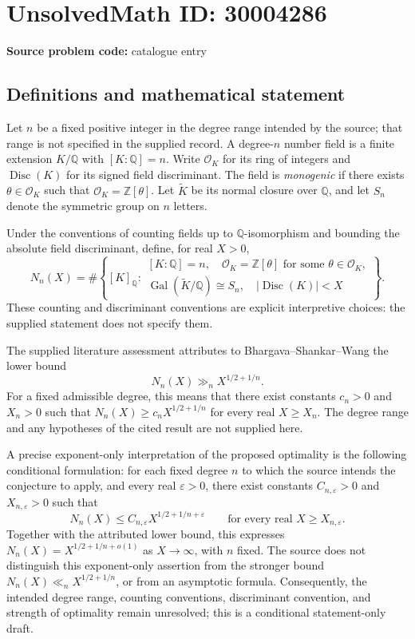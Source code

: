\documentclass[11pt]{article}
\newcommand{\Z}{\mathbb{Z}}
\newcommand{\Q}{\mathbb{Q}}
\begin{document}
\section*{UnsolvedMath ID: 30004286}
\textbf{Source problem code:} catalogue entry
\subsection{Definitions and mathematical statement}
Let \(n\) be a fixed positive integer in the degree range intended by the source; that range is not specified in the supplied record. A degree-\(n\) number field is a finite extension \(K/\Q\) with \([K:\Q]=n\). Write \(\mathcal O_K\) for its ring of integers and \(\operatorname{Disc}(K)\) for its signed field discriminant. The field is \emph{monogenic} if there exists \(\theta\in\mathcal O_K\) such that \(\mathcal O_K=\Z[\theta]\). Let \(\widetilde K\) be its normal closure over \(\Q\), and let \(S_n\) denote the symmetric group on \(n\) letters.

Under the conventions of counting fields up to \(\Q\)-isomorphism and bounding the absolute field discriminant, define, for real \(X>0\),
\[
N_n(X)=\#\left\{[K]_{\Q}:\begin{array}{l}
[K:\Q]=n,\quad \mathcal O_K=\Z[\theta]\text{ for some }\theta\in\mathcal O_K,\\
\operatorname{Gal}(\widetilde K/\Q)\cong S_n,\quad |\operatorname{Disc}(K)|<X
\end{array}\right\}.
\]
These counting and discriminant conventions are explicit interpretive choices: the supplied statement does not specify them.

The supplied literature assessment attributes to Bhargava--Shankar--Wang the lower bound
\[
N_n(X)\gg_n X^{1/2+1/n}.
\]
For a fixed admissible degree, this means that there exist constants \(c_n>0\) and \(X_n>0\) such that \(N_n(X)\ge c_nX^{1/2+1/n}\) for every real \(X\ge X_n\). The degree range and any hypotheses of the cited result are not supplied here.

A precise exponent-only interpretation of the proposed optimality is the following conditional formulation: for each fixed degree \(n\) to which the source intends the conjecture to apply, and every real \(\varepsilon>0\), there exist constants \(C_{n,\varepsilon}>0\) and \(X_{n,\varepsilon}>0\) such that
\[
N_n(X)\le C_{n,\varepsilon}X^{1/2+1/n+\varepsilon}
\qquad\text{for every real }X\ge X_{n,\varepsilon}.
\]
Together with the attributed lower bound, this expresses \(N_n(X)=X^{1/2+1/n+o(1)}\) as \(X\to\infty\), with \(n\) fixed. The source does not distinguish this exponent-only assertion from the stronger bound \(N_n(X)\ll_n X^{1/2+1/n}\), or from an asymptotic formula. Consequently, the intended degree range, counting conventions, discriminant convention, and strength of optimality remain unresolved; this is a conditional statement-only draft.
\end{document}
